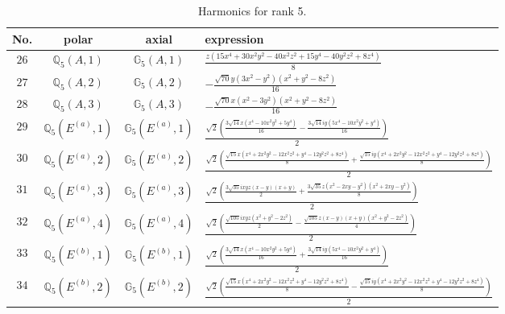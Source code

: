\documentclass[fleqn,8pt,landscape]{jsarticle}
\begin{document}
\begin{table}[ht!]
\begin{center}
\caption{Harmonics for rank 5.}
\renewcommand{\arraystretch}{1.3}
\begin{tabular}{cccl} \hline \hline
No. & polar & axial & expression \\ \hline
$ 26 $ & $ \mathbb{Q}_{5}(A,1) $ & $ \mathbb{G}_{5}(A,1) $ & $ \frac{z \left(15 x^{4} + 30 x^{2} y^{2} - 40 x^{2} z^{2} + 15 y^{4} - 40 y^{2} z^{2} + 8 z^{4}\right)}{8} $ \\
$ 27 $ & $ \mathbb{Q}_{5}(A,2) $ & $ \mathbb{G}_{5}(A,2) $ & $ - \frac{\sqrt{70} y \left(3 x^{2} - y^{2}\right) \left(x^{2} + y^{2} - 8 z^{2}\right)}{16} $ \\
$ 28 $ & $ \mathbb{Q}_{5}(A,3) $ & $ \mathbb{G}_{5}(A,3) $ & $ - \frac{\sqrt{70} x \left(x^{2} - 3 y^{2}\right) \left(x^{2} + y^{2} - 8 z^{2}\right)}{16} $ \\
$ 29 $ & $ \mathbb{Q}_{5}(E^{(a)},1) $ & $ \mathbb{G}_{5}(E^{(a)},1) $ & $ \frac{\sqrt{2} \left(\frac{3 \sqrt{14} x \left(x^{4} - 10 x^{2} y^{2} + 5 y^{4}\right)}{16} - \frac{3 \sqrt{14} i y \left(5 x^{4} - 10 x^{2} y^{2} + y^{4}\right)}{16}\right)}{2} $ \\
$ 30 $ & $ \mathbb{Q}_{5}(E^{(a)},2) $ & $ \mathbb{G}_{5}(E^{(a)},2) $ & $ \frac{\sqrt{2} \left(\frac{\sqrt{15} x \left(x^{4} + 2 x^{2} y^{2} - 12 x^{2} z^{2} + y^{4} - 12 y^{2} z^{2} + 8 z^{4}\right)}{8} + \frac{\sqrt{15} i y \left(x^{4} + 2 x^{2} y^{2} - 12 x^{2} z^{2} + y^{4} - 12 y^{2} z^{2} + 8 z^{4}\right)}{8}\right)}{2} $ \\
$ 31 $ & $ \mathbb{Q}_{5}(E^{(a)},3) $ & $ \mathbb{G}_{5}(E^{(a)},3) $ & $ \frac{\sqrt{2} \left(\frac{3 \sqrt{35} i x y z \left(x - y\right) \left(x + y\right)}{2} + \frac{3 \sqrt{35} z \left(x^{2} - 2 x y - y^{2}\right) \left(x^{2} + 2 x y - y^{2}\right)}{8}\right)}{2} $ \\
$ 32 $ & $ \mathbb{Q}_{5}(E^{(a)},4) $ & $ \mathbb{G}_{5}(E^{(a)},4) $ & $ \frac{\sqrt{2} \left(\frac{\sqrt{105} i x y z \left(x^{2} + y^{2} - 2 z^{2}\right)}{2} - \frac{\sqrt{105} z \left(x - y\right) \left(x + y\right) \left(x^{2} + y^{2} - 2 z^{2}\right)}{4}\right)}{2} $ \\
$ 33 $ & $ \mathbb{Q}_{5}(E^{(b)},1) $ & $ \mathbb{G}_{5}(E^{(b)},1) $ & $ \frac{\sqrt{2} \left(\frac{3 \sqrt{14} x \left(x^{4} - 10 x^{2} y^{2} + 5 y^{4}\right)}{16} + \frac{3 \sqrt{14} i y \left(5 x^{4} - 10 x^{2} y^{2} + y^{4}\right)}{16}\right)}{2} $ \\
$ 34 $ & $ \mathbb{Q}_{5}(E^{(b)},2) $ & $ \mathbb{G}_{5}(E^{(b)},2) $ & $ \frac{\sqrt{2} \left(\frac{\sqrt{15} x \left(x^{4} + 2 x^{2} y^{2} - 12 x^{2} z^{2} + y^{4} - 12 y^{2} z^{2} + 8 z^{4}\right)}{8} - \frac{\sqrt{15} i y \left(x^{4} + 2 x^{2} y^{2} - 12 x^{2} z^{2} + y^{4} - 12 y^{2} z^{2} + 8 z^{4}\right)}{8}\right)}{2} $ \\

\end{tabular}
\end{center}
\end{table}
\end{document}
